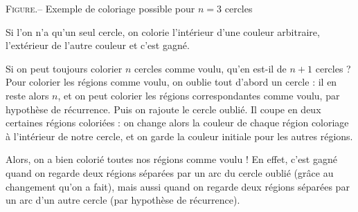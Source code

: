 \begin{exo}
\begin{center}

{\textsc{Figure.--} Exemple de coloriage possible pour $n=3$ cercles}

\end{center}

\end{exo}

\begin{sol}

Si l'on n'a qu'un seul cercle, on colorie l'int\'erieur d'une couleur arbitraire, l'ext\'erieur de l'autre couleur et c'est gagn\'e.

Si on peut toujours colorier $n$ cercles comme voulu, qu'en est-il de $n+1$ cercles ? Pour colorier les r\'egions comme voulu, on oublie tout d'abord un cercle : il en reste alors $n$, et on peut colorier les r\'egions correspondantes comme voulu, par hypoth\`ese de r\'ecurrence. Puis on rajoute le cercle oubli\'e. Il coupe en deux certaines r\'egions colori\'ees : on change alors la couleur de chaque r\'egion coloriage \`a  l'int\'erieur de notre cercle, et on garde la couleur initiale pour les autres r\'egions.

Alors, on a bien colori\'e toutes nos r\'egions comme voulu ! En effet, c'est gagn\'e quand on regarde deux r\'egions s\'epar\'ees par un arc du cercle oubli\'e (gr\^ace au changement qu'on a fait), mais aussi quand on regarde deux r\'egions s\'epar\'ees par un arc d'un autre cercle (par hypoth\`ese de r\'ecurrence).

\end{sol}


